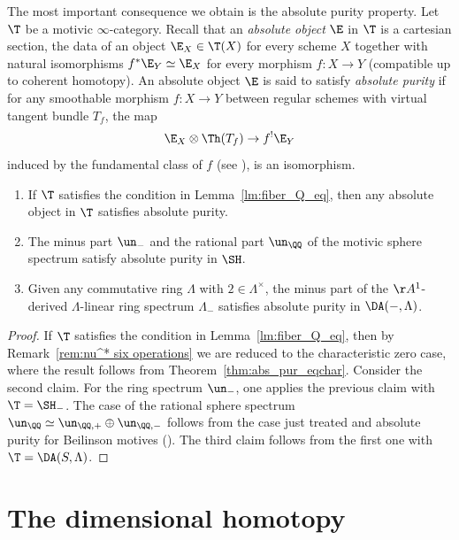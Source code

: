 \begin{num}
\label{num:abs_pur_def}
The most important consequence we obtain is the absolute purity property. Let $\T$ be a motivic $\infty$-category. Recall that an \emph{absolute object} $\E$ in $\T$ is a cartesian section, \ie the data of an object $\E_X\in\T(X)$ for every scheme $X$ together with natural isomorphisms $f^*\E_Y\simeq \E_X$ for every morphism $f:X\to Y$ (compatible up to coherent homotopy). An absolute object $\E$ is said to satisfy \emph{absolute purity} if for any smoothable morphism $f : X \to Y$ between regular schemes with virtual tangent bundle $T_f$, the map
\[
\E_X\otimes\Th(T_f)\to f^!\E_Y
\]
induced by the fundamental class of $f$ (see \cite[Def.\,4.3.7]{DJK}), is an isomorphism.
\end{num}
\skpt
\begin{thm}
\label{thm:absolute_purity}
\begin{enumerate}
\item If $\T$ satisfies the condition in Lemma~\ref{lm:fiber_Q_eq}, then any absolute object in $\T$ satisfies absolute purity.
\item The minus part $\un_-$ and the rational part $\un_\QQ$ of the motivic sphere spectrum
satisfy absolute purity in $\SH$.
\item Given any commutative ring $\Lambda$ with $2 \in \Lambda^\times$,
the minus part of the $\AA^1$-derived $\Lambda$-linear ring spectrum $\Lambda_{-}$
satisfies absolute purity in $\DA(-,\Lambda)$.
\end{enumerate}
\end{thm}
\begin{proof}
If $\T$ satisfies the condition in Lemma~\ref{lm:fiber_Q_eq}, then by Remark~\ref{rem:nu^* six operations} we are redu\-ced to the characteristic zero case, where the result follows from Theorem~\ref{thm:abs_pur_eqchar}.
Consider the second claim. For the ring spectrum $\un_-$, one applies the previous claim with $\T=\SH_-$.
The case of the rational sphere spectrum $\un_\QQ \simeq \un_{\QQ,+}\oplus\un_{\QQ,-}$ follows from the case just treated and absolute purity for Beilinson motives (\cite[Th.\,14.4.1]{CD3}).
The third claim follows from the first one with $\T=\DA(S,\Lambda)$.
\end{proof}

\section{The dimensional homotopy \texorpdfstring{\tstructure}{tstructure}}
\label{sec:t-structure}

